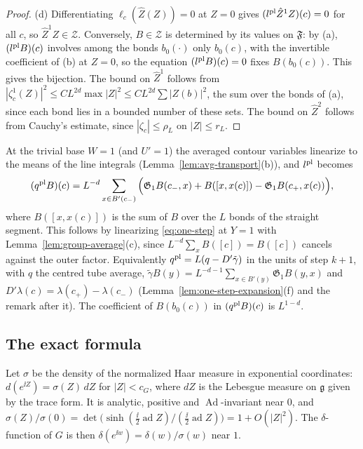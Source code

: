 \begin{proof}
(d) Differentiating $\ell_c(\hat Z(Z))=0$ at $Z=0$ gives $(l^{\rm pl}\hat Z^1Z)(c)=0$ for all $c$, so $\hat Z^1Z\in\mathcal Z$. Conversely, $B\in\mathcal Z$ is determined by its values on $\mathfrak F$: by (a), $(l^{\rm pl}B)(c)$ involves among the bonds $b_0(\cdot)$ only $b_0(c)$, with the invertible coefficient of (b) at $Z=0$, so the equation $(l^{\rm pl}B)(c)=0$ fixes $B(b_0(c))$. This gives the bijection. The bound on $\hat Z^1$ follows from $|\zeta^{1}_c(Z)|^2\le CL^{2d}\max|Z|^2\le CL^{2d}\sum|Z(b)|^2$, the sum over the bonds of (a), since each bond lies in a bounded number of these sets. The bound on $\hat Z^2$ follows from Cauchy's estimate, since $|\zeta_c|\le\rho_L$ on $|Z|\le r_L$.
\end{proof}

At the trivial base $W=1$ (and $U'=1$) the averaged contour variables linearize to the means of the line integrals (Lemma~\ref{lem:avg-transport}(b)), and $l^{\rm pl}$ becomes
\begin{equation}\label{eq:q-plain}
(q^{\rm pl}B)(c)=L^{-d}\sum_{x\in B'(c_-)}\Big(\mathfrak G_1B(c_-,x)+B([x,x(c)])-\mathfrak G_1B(c_+,x(c))\Big),
\end{equation}
where $B([x,x(c)])$ is the sum of $B$ over the $L$ bonds of the straight segment. This follows by linearizing \eqref{eq:one-step} at $Y=1$ with Lemma~\ref{lem:group-average}(c), since $L^{-d}\sum_xB([c])=B([c])$ cancels against the outer factor. Equivalently $q^{\rm pl}=L(q-D'\tilde\gamma)$ in the units of step $k+1$, with $q$ the centred tube average, $\tilde\gamma B(y)=L^{-d-1}\sum_{x\in B'(y)}\mathfrak G_1B(y,x)$ and $D'\lambda(c)=\lambda(c_+)-\lambda(c_-)$ (Lemma~\ref{lem:one-step-expansion}(f) and the remark after it). The coefficient of $B(b_0(c))$ in $(q^{\rm pl}B)(c)$ is $L^{1-d}$.

\subsection{The exact formula}\label{subsec:exact-formula}

Let $\sigma$ be the density of the normalized Haar measure in exponential coordinates: $d(e^{\ii Z})=\sigma(Z)\,dZ$ for $|Z|<c_G$, where $dZ$ is the Lebesgue measure on $\mathfrak g$ given by the trace form. It is analytic, positive and $\operatorname{Ad}$-invariant near $0$, and $\sigma(Z)/\sigma(0)=\det\big(\sinh(\tfrac{\ii}{2}\operatorname{ad}Z)/(\tfrac{\ii}{2}\operatorname{ad}Z)\big)=1+O(|Z|^2)$. The $\delta$-function of $G$ is then $\delta(e^{\ii w})=\delta(w)/\sigma(w)$ near $1$.

